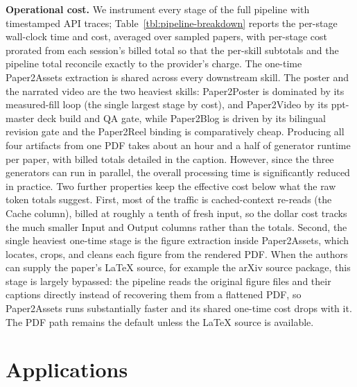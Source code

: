 \documentclass{article}
\begin{document}
\textbf{Operational cost.} We instrument every stage of the full pipeline with timestamped API traces; Table~\ref{tbl:pipeline-breakdown} reports the per-stage wall-clock time and cost, averaged over sampled papers, with per-stage cost prorated from each session's billed total so that the per-skill subtotals and the pipeline total reconcile exactly to the provider's charge. The one-time Paper2Assets extraction is shared across every downstream skill. The poster and the narrated video are the two heaviest skills: Paper2Poster is dominated by its measured-fill loop (the single largest stage by cost), and Paper2Video by its ppt-master deck build and QA gate, while Paper2Blog is driven by its bilingual revision gate and the Paper2Reel binding is comparatively cheap. Producing all four artifacts from one PDF takes about an hour and a half of generator runtime per paper, with billed totals detailed in the caption. However, since the three generators can run in parallel, the overall processing time is significantly reduced in practice. Two further properties keep the effective cost below what the raw token totals suggest. First, most of the traffic is cached-context re-reads (the Cache column), billed at roughly a tenth of fresh input, so the dollar cost tracks the much smaller Input and Output columns rather than the totals. Second, the single heaviest one-time stage is the figure extraction inside Paper2Assets, which locates, crops, and cleans each figure from the rendered PDF. When the authors can supply the paper's LaTeX source, for example the arXiv source package, this stage is largely bypassed: the pipeline reads the original figure files and their captions directly instead of recovering them from a flattened PDF, so Paper2Assets runs substantially faster and its shared one-time cost drops with it. The PDF path remains the default unless the LaTeX source is available.

\section{Applications}\label{sec:applications}
\end{document}
